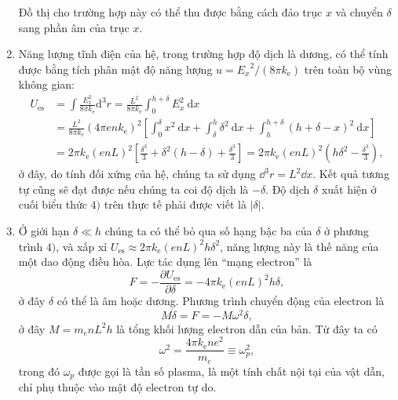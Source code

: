 \begin{loigiai}
\begin{enumerate}[1)]
Đồ thị cho trường hợp này có thể thu được bằng cách đảo trục $x$ và chuyển $\delta$ sang phần âm của trục $x$.
\item Năng lượng tĩnh điện của hệ, trong trường hợp độ dịch là dương, có thể tính được bằng tích phân mật độ năng lượng $u={E_x}^2/(8\pi k_{\mathrm{e}})$ trên toàn bộ vùng không gian:
 \[\begin{aligned}
U_{\mathrm{es}} &=\int \frac{E_{x}^{2}}{8 \pi k_{\mathrm{e}}} \mathrm{d}^{3} r=\frac{L^{2}}{8 \pi k_{\mathrm{e}}} \int_{0}^{h+\delta} E_{x}^{2} \mathrm{~d} x \\
&=\frac{L^{2}}{8 \pi k_{\mathrm{e}}}(4 \pi e n k_{\mathrm{e}})^{2}\left[\int_{0}^{\delta} x^{2} \mathrm{~d} x+\int_{\delta}^{h} \delta^{2} \mathrm{~d} x+\int_{h}^{h+\delta}(h+\delta-x)^{2} \mathrm{~d} x\right] \\
&=2 \pi k_{\mathrm{e}}(e n L)^{2}\left[\frac{\delta^{3}}{3}+\delta^{2}(h-\delta)+\frac{\delta^{3}}{3}\right]=2 \pi k_{\mathrm{e}}(e n L)^{2}\left(h \delta^{2}-\frac{\delta^{3}}{3}\right),
\end{aligned} \tag{4} \]
ở đây, do tính đối xứng của hệ, chúng ta sử dụng $\dd^3 r = L^2 \dd x $. Kết quả tương tự cũng sẽ đạt được nếu chúng ta coi độ dịch là $-\delta$. Độ dịch $\delta$ xuất hiện ở cuối biểu thức $4)$ trên thực tế phải được viết là $|\delta|$.
\item Ở giới hạn $\delta \ll h$ chúng ta có thể bỏ qua số hạng bậc ba của $\delta$ ở phương trình $4)$, và xấp xỉ $U_{\mathrm{es}} \approx 2\pi k_{\mathrm{e}} (enL)^2 h \delta^2$, năng lượng này là thế năng của một dao động điều hòa. Lực tác dụng lên ``mạng electron'' là 
   \[F= - \frac{\partial U_{\mathrm{es}}}{\partial \delta} = - 4 \pi k_{\mathrm{e}} (enL)^2h\delta, \tag{5}\]
ở đây $\delta$ có thể là âm hoặc dương. Phương trình chuyển động của electron là 
   \[M\ddot{\delta} = F = -M\omega^2\delta, \tag{6}\]
ở đây $M= m_e nL^2h$ là tổng khối lượng electron dẫn của bản. Từ đây ta có
     \[\omega^2 = \frac{4\pi k_{\mathrm{e}} n e^2}{m_e} \equiv \omega_p^2, \tag{7}\]
trong đó $\omega_p$ được gọi là tần số plasma, là một tính chất nội tại của vật dẫn, chỉ phụ thuộc vào mật độ electron tự do.
\end{enumerate}
\end{loigiai}

